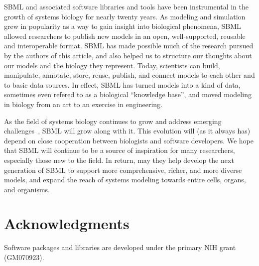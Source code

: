 \documentclass[]{draft-sbml-paper}
\begin{document}
SBML and associated software libraries and tools have been instrumental in the growth of systems biology for nearly twenty years.  As modeling and simulation grew in popularity as a way to gain insight into biological phenomena, SBML allowed researchers to publish new models in an open, well-supported, reusable and interoperable format. SBML has made possible much of the research pursued by the authors of this article, and also helped us to structure our thoughts about our models and the biology they represent.  Today, scientists can build, manipulate, annotate, store, reuse, publish, and connect models to each other and to basic data sources.  In effect, SBML has turned models into a kind of data, sometimes even refered to as a biological ``knowledge base'', and moved modeling in biology from an art to an exercise in engineering.

As the field of systems biology continues to grow and address emerging challenges~\citep{Cvijovic2014bridging, Macilwain2011systems}, SBML will grow along with it.  This evolution will (as it always has) depend on close cooperation between biologists and software developers.  We hope that SBML will continue to be a source of inspiration for many researchers, especially those new to the field.  In return, may they help develop the next generation of SBML to support more comprehensive, richer, and more diverse models, and expand the reach of systems modeling towards entire cells, organs, and organisms.


\section{Acknowledgments}

Software packages and libraries are developed  under the primary NIH grant (GM070923).

\clearpage



\end{document}
